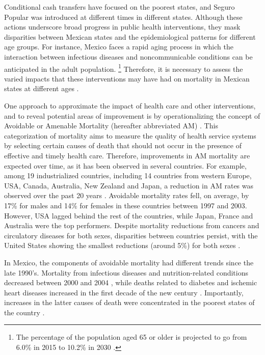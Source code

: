 \documentclass{bmcart}
\begin{document}
Conditional cash transfers have focused on the poorest states, and Seguro Popular was introduced at different times in different states. Although these actions underscore broad progress in public health interventions, they mask disparities between Mexican states and the epidemiological patterns for different age groups. For instance, Mexico faces a rapid aging process in which the interaction between infectious diseases and noncommunicable conditions can be anticipated in the adult population. \cite{Bygbjerg1499}\footnote{The percentage of the population aged 65 or older is projected to go from 6.0\% in 2015 to 10.2\% in 2030 \cite{CONAPO}.}  Therefore, it is necessary to assess the varied impacts that these interventions may have had on mortality in Mexican states at different ages \cite{urquieta2015evolution}. 

 
 One approach to approximate the impact of health care and other interventions, and to reveal potential areas of improvement is by operationalizing the
 concept of Avoidable or Amenable Mortality (hereafter abbreviated AM)
 \cite{nolte&mckee2004, nolte&mckee2008,elo2014}. This categorization of mortality aims to measure the quality of health service systems by selecting certain
 causes of death that should not occur in the presence of effective and
 timely health care. Therefore, improvements in AM mortality are expected over time, as it has been observed in several countries. For example, among 19 industrialized countries, including 14 countries from western Europe, USA, Canada, Australia, New Zealand and Japan, a reduction in AM rates was
 observed over the past 20 years
 \cite{nolte&mckee2008}. Avoidable mortality rates fell, on average, by 17\%
 for males and 14\% for females in these countries between 1997 and 2003. However, USA lagged behind the rest of the countries, while Japan, France and Australia were the top performers. Despite mortality reductions from cancers and circulatory diseases for
 both sexes, disparities between countries persist, with the United
 States showing the smallest reductions (around 5\%) for both sexes  \cite{nolte&mckee2008}. 
 
 In Mexico, the components of avoidable mortality had different trends since the
late 1990's. Mortality from infectious diseases and nutrition-related conditions decreased between 2000 and 2004 \cite{francomarina2006}, while deaths related to diabetes and ischemic heart diseases increased in the first decade of the new century \cite{davila2014mortalidad}. Importantly, increases in the latter causes
of death were concentrated in the poorest states of the country
\cite{davila2014mortalidad}. 
\end{document}

